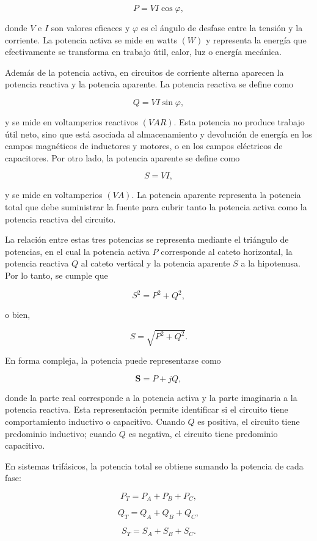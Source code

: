 	\[
	P = VI\cos\varphi,
	\]
	
	donde $V$ e $I$ son valores eficaces y $\varphi$ es el ángulo de desfase entre la tensión y la corriente. La potencia activa se mide en watts $(W)$ y representa la energía que efectivamente se transforma en trabajo útil, calor, luz o energía mecánica.
	
	Además de la potencia activa, en circuitos de corriente alterna aparecen la potencia reactiva y la potencia aparente. La potencia reactiva se define como
	
	\[
	Q = VI\sin\varphi,
	\]
	
	y se mide en voltamperios reactivos $(VAR)$. Esta potencia no produce trabajo útil neto, sino que está asociada al almacenamiento y devolución de energía en los campos magnéticos de inductores y motores, o en los campos eléctricos de capacitores. Por otro lado, la potencia aparente se define como
	
	\[
	S = VI,
	\]
	
	y se mide en voltamperios $(VA)$. La potencia aparente representa la potencia total que debe suministrar la fuente para cubrir tanto la potencia activa como la potencia reactiva del circuito.
	
	La relación entre estas tres potencias se representa mediante el triángulo de potencias, en el cual la potencia activa $P$ corresponde al cateto horizontal, la potencia reactiva $Q$ al cateto vertical y la potencia aparente $S$ a la hipotenusa. Por lo tanto, se cumple que
	
	\[
	S^2 = P^2 + Q^2,
	\]
	
	o bien,
	
	\[
	S = \sqrt{P^2+Q^2}.
	\]
	
	En forma compleja, la potencia puede representarse como
	
	\[
	\mathbf{S}=P+jQ,
	\]
	
	donde la parte real corresponde a la potencia activa y la parte imaginaria a la potencia reactiva. Esta representación permite identificar si el circuito tiene comportamiento inductivo o capacitivo. Cuando $Q$ es positiva, el circuito tiene predominio inductivo; cuando $Q$ es negativa, el circuito tiene predominio capacitivo.
	
	En sistemas trifásicos, la potencia total se obtiene sumando la potencia de cada fase:
	
	\[
	P_T=P_A+P_B+P_C,
	\]
	
	\[
	Q_T=Q_A+Q_B+Q_C,
	\]
	
	\[
	S_T=S_A+S_B+S_C.
	\]
	
